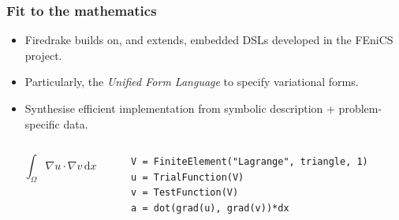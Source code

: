 \documentclass[presentation]{beamer}
\begin{document}
\begin{frame}[fragile]
  \frametitle{Fit to the mathematics}
  \begin{itemize}
  \item Firedrake builds on, and extends, embedded DSLs developed in
    the FEniCS project.
  \item Particularly, the \emph{Unified Form Language} to
    specify variational forms.
  \item Synthesise efficient implementation from symbolic description
    + problem-specific data.
  \end{itemize}
  \begin{columns}
    \begin{column}{0.4\textwidth}
      \begin{equation*}
        \int_\Omega \nabla u \cdot \nabla v\,\text{d}x
      \end{equation*}
    \end{column}
    \hspace{-3em}
    \begin{column}{0.6\textwidth}
\begin{verbatim}
V = FiniteElement("Lagrange", triangle, 1)
u = TrialFunction(V)
v = TestFunction(V)
a = dot(grad(u), grad(v))*dx
\end{verbatim}
    \end{column}
  \end{columns}
\end{frame}
\end{document}
